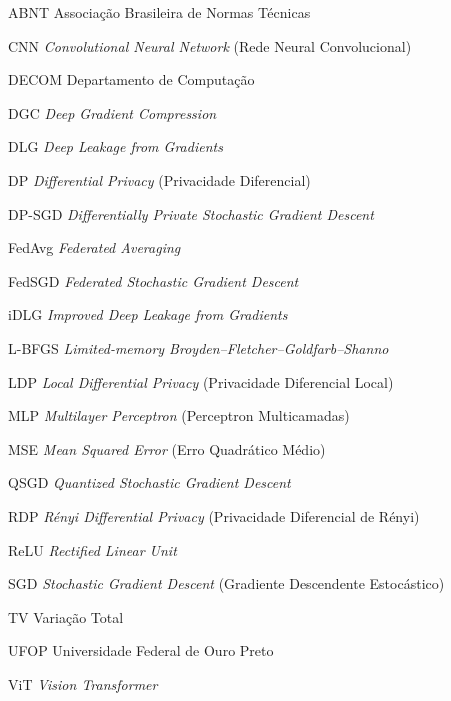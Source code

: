 \begin{siglas}
  \item[ABNT] Associação Brasileira de Normas Técnicas
  \item[CNN] \textit{Convolutional Neural Network} (Rede Neural Convolucional)
  \item[DECOM] Departamento de Computação
  \item[DGC] \textit{Deep Gradient Compression}
  \item[DLG] \textit{Deep Leakage from Gradients}
  \item[DP] \textit{Differential Privacy} (Privacidade Diferencial)
  \item[DP-SGD] \textit{Differentially Private Stochastic Gradient Descent}
  \item[FedAvg] \textit{Federated Averaging}
  \item[FedSGD] \textit{Federated Stochastic Gradient Descent}
  \item[iDLG] \textit{Improved Deep Leakage from Gradients}
  \item[L-BFGS] \textit{Limited-memory Broyden--Fletcher--Goldfarb--Shanno}
  \item[LDP] \textit{Local Differential Privacy} (Privacidade Diferencial Local)
  \item[MLP] \textit{Multilayer Perceptron} (Perceptron Multicamadas)
  \item[MSE] \textit{Mean Squared Error} (Erro Quadrático Médio)
  \item[QSGD] \textit{Quantized Stochastic Gradient Descent}
  \item[RDP] \textit{Rényi Differential Privacy} (Privacidade Diferencial de Rényi)
  \item[ReLU] \textit{Rectified Linear Unit}
  \item[SGD] \textit{Stochastic Gradient Descent} (Gradiente Descendente Estocástico)
  \item[TV] Variação Total
  \item[UFOP] Universidade Federal de Ouro Preto
  \item[ViT] \textit{Vision Transformer}
\end{siglas}
